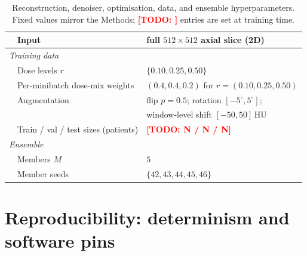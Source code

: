 \documentclass{article}
\newcommand{\todo}[1]{\textcolor{red}{\textbf{[TODO: #1]}}}
\begin{document}
\begin{table}[h]
\begin{tabular}{lll}
    & Input                                & full $512\times512$ axial slice (2D) \\
    \midrule
    \multicolumn{3}{l}{\emph{Training data}} \\
    & Dose levels $r$                      & $\{0.10, 0.25, 0.50\}$ \\
    & Per-minibatch dose-mix weights       & $(0.4, 0.4, 0.2)$ for $r=(0.10,0.25,0.50)$ \\
    & Augmentation                         & flip $p{=}0.5$; rotation $[-5^\circ,5^\circ]$; \\
    &                                      & window-level shift $[-50,50]$\,HU \\
    & Train / val / test sizes (patients)  & \todo{N / N / N} \\
    \midrule
    \multicolumn{3}{l}{\emph{Ensemble}} \\
    & Members $M$                          & $5$ \\
    & Member seeds                         & $\{42, 43, 44, 45, 46\}$ \\
    \bottomrule
  \end{tabular}
  \caption{Reconstruction, denoiser, optimisation, data, and ensemble
  hyperparameters. Fixed values mirror the Methods; \todo{} entries are set
  at training time.}
  \label{tab:supp_hyperparams}
\end{table}

\section{Reproducibility: determinism and software pins}
\end{document}
